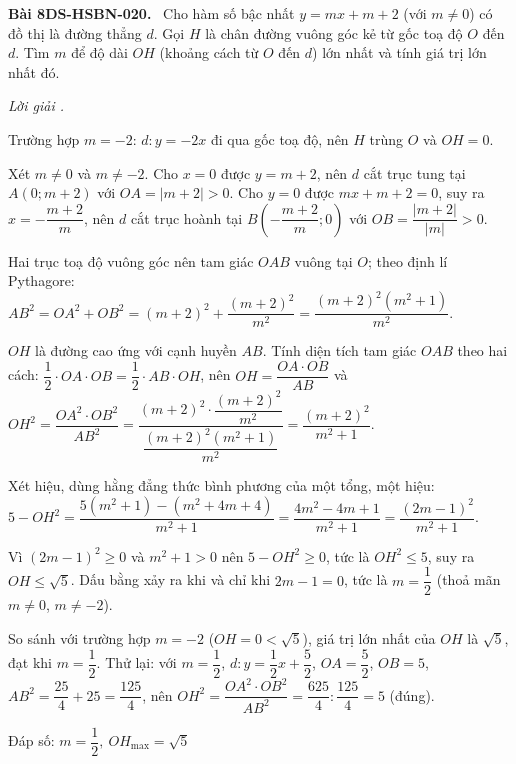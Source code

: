 \documentclass[12pt,a4paper]{article}
\newenvironment{problem}[1][]{\par\medskip\noindent\textbf{Bài #1.}\ }{\par}
\newenvironment{solution}[1][]{\par\noindent\textit{Lời giải #1.}\par}{\par}
\begin{document}
\begin{problem}[8DS-HSBN-020]
Cho hàm số bậc nhất $y = mx + m + 2$ (với $m \neq 0$) có đồ thị là đường thẳng $d$. Gọi $H$ là chân đường vuông góc kẻ từ gốc toạ độ $O$ đến $d$. Tìm $m$ để độ dài $OH$ (khoảng cách từ $O$ đến $d$) lớn nhất và tính giá trị lớn nhất đó.

\begin{solution}
Trường hợp $m = -2$: $d: y = -2x$ đi qua gốc toạ độ, nên $H$ trùng $O$ và $OH = 0$.

Xét $m \neq 0$ và $m \neq -2$. Cho $x = 0$ được $y = m + 2$, nên $d$ cắt trục tung tại $A(0; m + 2)$ với $OA = |m + 2| > 0$. Cho $y = 0$ được $mx + m + 2 = 0$, suy ra $x = -\dfrac{m + 2}{m}$, nên $d$ cắt trục hoành tại $B\left(-\dfrac{m + 2}{m}; 0\right)$ với $OB = \dfrac{|m + 2|}{|m|} > 0$.

Hai trục toạ độ vuông góc nên tam giác $OAB$ vuông tại $O$; theo định lí Pythagore: $AB^2 = OA^2 + OB^2 = (m + 2)^2 + \dfrac{(m + 2)^2}{m^2} = \dfrac{(m + 2)^2(m^2 + 1)}{m^2}$.

$OH$ là đường cao ứng với cạnh huyền $AB$. Tính diện tích tam giác $OAB$ theo hai cách: $\dfrac{1}{2} \cdot OA \cdot OB = \dfrac{1}{2} \cdot AB \cdot OH$, nên $OH = \dfrac{OA \cdot OB}{AB}$ và $OH^2 = \dfrac{OA^2 \cdot OB^2}{AB^2} = \dfrac{(m + 2)^2 \cdot \dfrac{(m + 2)^2}{m^2}}{\dfrac{(m + 2)^2(m^2 + 1)}{m^2}} = \dfrac{(m + 2)^2}{m^2 + 1}$.

Xét hiệu, dùng hằng đẳng thức bình phương của một tổng, một hiệu: $5 - OH^2 = \dfrac{5(m^2 + 1) - (m^2 + 4m + 4)}{m^2 + 1} = \dfrac{4m^2 - 4m + 1}{m^2 + 1} = \dfrac{(2m - 1)^2}{m^2 + 1}$.

Vì $(2m - 1)^2 \geq 0$ và $m^2 + 1 > 0$ nên $5 - OH^2 \geq 0$, tức là $OH^2 \leq 5$, suy ra $OH \leq \sqrt{5}$. Dấu bằng xảy ra khi và chỉ khi $2m - 1 = 0$, tức là $m = \dfrac{1}{2}$ (thoả mãn $m \neq 0$, $m \neq -2$).

So sánh với trường hợp $m = -2$ ($OH = 0 < \sqrt{5}$), giá trị lớn nhất của $OH$ là $\sqrt{5}$, đạt khi $m = \dfrac{1}{2}$. Thử lại: với $m = \dfrac{1}{2}$, $d: y = \dfrac{1}{2}x + \dfrac{5}{2}$, $OA = \dfrac{5}{2}$, $OB = 5$, $AB^2 = \dfrac{25}{4} + 25 = \dfrac{125}{4}$, nên $OH^2 = \dfrac{OA^2 \cdot OB^2}{AB^2} = \dfrac{625}{4} : \dfrac{125}{4} = 5$ (đúng).

Đáp số: $\boxed{m = \dfrac{1}{2},\ OH_{\max} = \sqrt{5}}$
\end{solution}
\end{problem}
\end{document}
